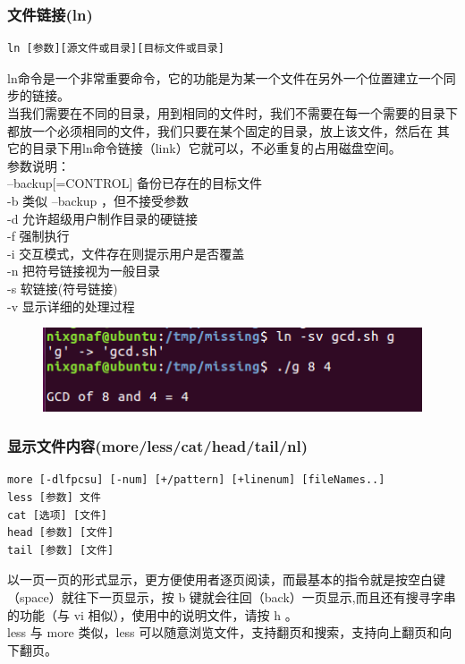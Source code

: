 \documentclass{article}
\begin{document}
\subsubsection{文件链接(ln)}
\begin{lstlisting}[style=myStyle]
 ln [参数][源文件或目录][目标文件或目录]
\end{lstlisting}
 ln命令是一个非常重要命令，它的功能是为某一个文件在另外一个位置建立一个同步的链接。\\
当我们需要在不同的目录，用到相同的文件时，我们不需要在每一个需要的目录下都放一个必须相同的文件，我们只要在某个固定的目录，放上该文件，然后在 其它的目录下用ln命令链接（link）它就可以，不必重复的占用磁盘空间。\\
参数说明：\\
--backup[=CONTROL] 备份已存在的目标文件\\
-b 类似 --backup ，但不接受参数\\
-d 允许超级用户制作目录的硬链接\\
-f 强制执行\\
-i 交互模式，文件存在则提示用户是否覆盖\\
-n 把符号链接视为一般目录\\
-s 软链接(符号链接)\\
-v 显示详细的处理过程\\

\begin{figure}[h]
    \centering
    \includegraphics[width=0.5\linewidth]{image17.png}
\end{figure}

\subsubsection{显示文件内容(more/less/cat/head/tail/nl)}
\begin{lstlisting}[style=myStyle]
more [-dlfpcsu] [-num] [+/pattern] [+linenum] [fileNames..]
less [参数] 文件 
cat [选项] [文件]
head [参数] [文件]
tail [参数] [文件]  
\end{lstlisting}
以一页一页的形式显示，更方便使用者逐页阅读，而最基本的指令就是按空白键（space）就往下一页显示，按 b 键就会往回（back）一页显示,而且还有搜寻字串的功能（与 vi 相似），使用中的说明文件，请按 h 。\\
less 与 more 类似，less 可以随意浏览文件，支持翻页和搜索，支持向上翻页和向下翻页。\\
\end{document}
